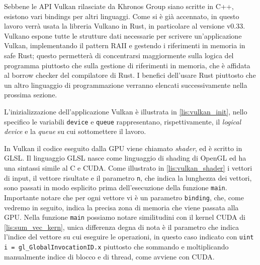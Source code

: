 Sebbene le API Vulkan rilasciate da Khronos Group siano scritte in C++, esistono vari bindings per altri linguaggi. Come si è già accennato, in questo lavoro verrà usata la libreria Vulkano \cite[]{github:Vulkano} in Rust, in particolare al versione v0.33. Vulkano espone tutte le strutture dati necessarie per scrivere un'applicazione Vulkan, implementando il pattern \gls{RAII} e gestendo i riferimenti in memoria in safe Rust; questo permetterà di concentrarsi maggiormente sulla logica del programma piuttosto che sulla gestione di riferimenti in memoria, che è affidata al borrow checker \cite[]{Rust:borrow_checker} del compilatore di Rust. I benefici dell'usare Rust piuttosto che un altro linguaggio di programmazione verranno elencati successivamente nella prossima sezione.

\vspace{5mm}
 
\vspace{5mm}

L'inizializzazione dell'applicazione Vulkan è illustrata in \ref{lis:vulkan_init}, nello specifico le variabili \verb|device| e \verb|queue| rappresentano, rispettivamente, il \textit{logical device} e la \textit{queue} su cui sottomettere il lavoro. 

In Vulkan il codice eseguito dalla GPU viene chiamato \textit{shader}, ed è scritto in \gls{GLSL}. Il linguaggio GLSL nasce come linguaggio di shading di OpenGL ed ha una sintassi simile al C e CUDA. Come illustrato in \ref{lis:vulkan_shader} i vettori di input, il vettore risultate e il parametro \verb|n|, che indica la lunghezza dei vettori, sono passati in modo esplicito prima dell'esecuzione della funzione \verb|main|. Importante notare che per ogni vettore vi è un parametro \verb|binding|, che, come vedremo in seguito, indica la precisa zona di memoria che viene passata alla GPU. Nella funzione \verb|main| possiamo notare similitudini con il kernel CUDA di \ref{lis:sum_vec_kern}, unica differenza degna di nota è il parametro che indica l'indice del vettore su cui eseguire le operazioni, in questo caso indicato con \verb|uint i = gl_GlobalInvocationID.x| piuttosto che sommando e moltiplicando manualmente indice di blocco e di thread, come avviene con CUDA.


